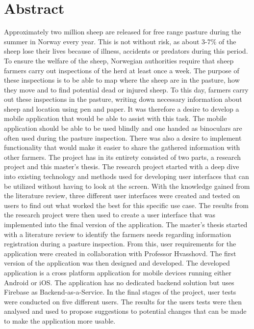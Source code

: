 \chapter*{Abstract}
Approximately two million sheep are released for free range pasture during the summer in Norway every year. This is not without risk, as about 3-7\% of the sheep lose their lives because of illness, accidents or predators during this period. To ensure the welfare of the sheep, Norwegian authorities require that sheep farmers carry out inspections of the herd at least once a week. The purpose of these inspections is to be able to map where the sheep are in the pasture, how they move and to find potential dead or injured sheep. To this day, farmers carry out these inspections in the pasture, writing down necessary information about sheep and location using pen and paper. It was therefore a desire to develop a mobile application that would be able to assist with this task. The mobile application should be able to be used blindly and one handed as binoculars are often used during the pasture inspection. There was also a desire to implement functionality that would make it easier to share the gathered information with other farmers.
\newline
\newline
The project has in its entirety consisted of two parts, a research project and this master’s thesis. The research project started with a deep dive into existing technology and methods used for developing user interfaces that can be utilized without having to look at the screen. With the knowledge gained from the literature review, three different user interfaces were created and tested on users to find out what worked the best for this specific use case. The results from the research project were then used to create a user interface that was implemented into the final version of the application.
\newline
\newline
The master’s thesis started with a literature review to identify the farmers needs regarding information registration during a pasture inspection. From this, user requirements for the application were created in collaboration with Professor Hvasshovd. The first version of the application was then designed and developed. The developed application is a cross platform application for mobile devices running either Android or iOS. The application has no dedicated backend solution but uses Firebase as Backend-as-a-Service. In the final stages of the project, user tests were conducted on five different users. The results for the users tests were then analysed and used to propose suggestions to potential changes that can be made to make the application more usable.
